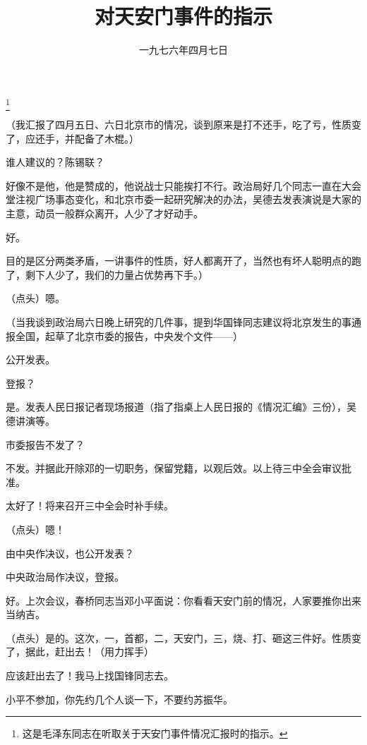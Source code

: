 
\title{对天安门事件的指示}
\date{一九七六年四月七日}
\thanks{这是毛泽东同志在听取关于天安门事件情况汇报时的指示。}
\maketitle


（我汇报了四月五日、六日北京市的情况，谈到原来是打不还手，吃了亏，性质变了，应还手，并配备了木棍。）

谁人建议的？陈锡联？

好像不是他，他是赞成的，他说战士只能挨打不行。政治局好几个同志一直在大会堂注视广场事态变化，和北京市委一起研究解决的办法，吴德去发表演说是大家的主意，动员一般群众离开，人少了才好动手。

好。

目的是区分两类矛盾，一讲事件的性质，好人都离开了，当然也有坏人聪明点的跑了，剩下人少了，我们的力量占优势再下手。）

（点头）嗯。

（当我谈到政治局六日晚上研究的几件事，提到华国锋同志建议将北京发生的事通报全国，起草了北京市委的报告，中央发个文件——）

公开发表。

登报？

是。发表人民日报记者现场报道（指了指桌上人民日报的《情况汇编》三份），吴德讲演等。

市委报告不发了？

不发。并据此开除邓的一切职务，保留党籍，以观后效。以上待三中全会审议批准。

太好了！将来召开三中全会时补手续。

（点头）嗯！

由中央作决议，也公开发表？

中央政治局作决议，登报。

好。上次会议，春桥同志当邓小平面说：你看看天安门前的情况，人家要推你出来当纳吉。

（点头）是的。这次，一，首都，二，天安门，三，烧、打、砸这三件好。性质变了，据此，赶出去！（用力挥手）

应该赶出去了！我马上找国锋同志去。

小平不参加，你先约几个人谈一下，不要约苏振华。

